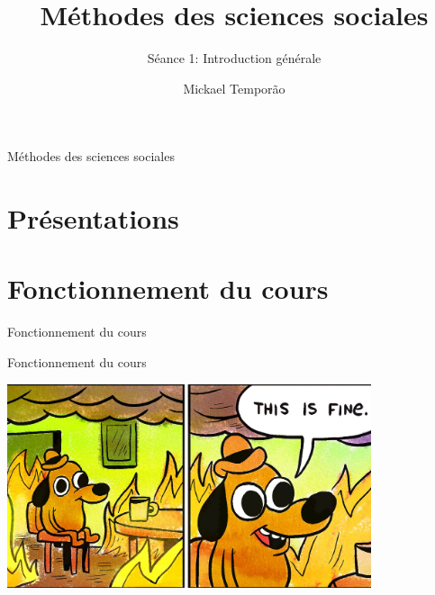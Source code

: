 \documentclass[10pt]{beamer}
\title{Méthodes des sciences sociales}
\subtitle{Séance 1: Introduction générale}
\author{Mickael Temporão}
\begin{document}
\maketitle

\begin{frame}{Méthodes des sciences sociales}
    \vspace{24pt}
\end{frame}

\section{Présentations}
\section{Fonctionnement du cours}

\begin{frame}{Fonctionnement du cours}
\end{frame}

\begin{frame}{Fonctionnement du cours}
    \begin{center}
    \includegraphics[height=6cm, trim=0 0.5 3.7cm .5, clip]{fine.jpg}
    \end{center}
\end{frame}
\end{document}
